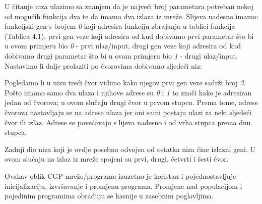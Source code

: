 \newline
\par 
U čitanje niza ulazimo sa znanjem da je najveći broj parametara potreban nekoj od mogućih funkcija dva te da imamo dva izlaza iz mreže. Slijeva nadesno imamo: funkcijski gen s brojem \textit{0} koji adresira funkciju zbrajanja u tablici funkcija (Tablica 4.1), prvi gen veze koji adresira od kud dobivamo prvi parametar što bi u ovom primjeru bio \textit{0} - prvi ulaz/input, drugi gen veze koji adresira od kud dobivamo drugi parametar što bi u ovom primjeru bio \textit{1} - drugi ulaz/input. Nastavimo li dalje prolaziti po čvorovima dobivamo sljedeći niz: \newline

\newline
\par
Pogledamo li u nizu treći čvor vidimo kako njegov prvi gen veze sadrži broj \textit{3}. Pošto imamo samo dva ulaza i njihove adrese su \textit{0} i \textit{1} to znači kako je adresiran jedan od čvorova; u ovom slučaju drugi čvor u prvom stupcu. Prema tome, adrese čvorova nastavljaju se na adrese ulaza jer oni sami postaju ulazi za neki sljedeći čvor ili izlaz. Adrese se povećavaju s lijeva nadesno i od vrha stupca prema dnu stupca.\par
Zadnji dio niza koji je ovdje posebno odvojen od ostatka niza čine izlazni geni. U ovom slučaju na izlaz iz mreže spojeni su prvi, drugi, četvrti i šesti čvor. \par
Ovakav oblik CGP mreže/programa izuzetno je koristan i pojednostavljuje inicijalizaciju, izvršavanje i promjenu programa. Promjene nad populacijom i pojedinim programima obrađuju se kasnije u zasebnim poglavljima.\par 

